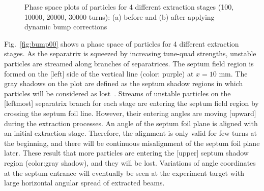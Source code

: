 \documentclass[aps,prstab,onecolumn,preprint,endfloats,11pt]{revtex4-1}
\begin{document}
\begin{figure}[!tbp]
  \caption{\label{fig:bump0}Phase space plots of particles for 4 different extraction stages (100, 10000, 20000, 30000 turns): (a) before and (b) after applying dynamic bump corrections}
\end{figure}

Fig.~\ref{fig:bump00} shows a phase space of particles for 4 different extraction stages.
As the separatrix is squeezed by increasing tune-quad strengths, unstable particles are streamed along branches of separatrices. 
The septum field region is formed on the [left] side of the vertical line (color: purple) at $x=10$ mm. 
The gray shadows on the plot are defined as the septum shadow regions in which particles will be considered as lost~\cite{m.pullia}.
Streams of unstable particles on the [leftmost] separatrix branch for each stage are entering the septum field region by crossing the septum foil line.
However, their entering angles are moving [upward] during the extraction processes.
An angle of the septum foil plane is aligned with an initial extraction stage.
Therefore, the alignment is only valid for few turns at the beginning, and there will be continuous misalignment of the septum foil plane later.
These result that more particles are entering the [upper] septum shadow region (color:gray shadow), and they will be lost.
Variations of angle coordinates at the septum entrance will eventually be seen at the experiment target with large horizontal angular spread of extracted beams.
\end{document}
